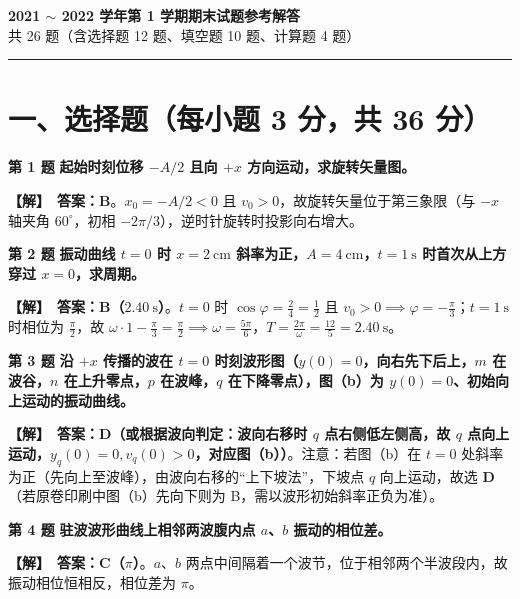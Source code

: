 \documentclass[zihao=5,a4paper,UTF8]{ctexart}
\newenvironment{prob}[2]{%
    \par\vspace{5pt}\noindent\textbf{\color{navy}#1} \textbf{#2}\par\nopagebreak\vspace{2pt}%
}{%
    \par\vspace{3pt}%
}
\newcommand{\sol}{\noindent\textbf{\color{tealaccent}【解】}\ }
\begin{document}
\begin{center}
    {\Large\bfseries\color{navy} 2021 $\sim$ 2022 学年第 1 学期期末试题参考解答}\\[4pt]
    {\small\color{gray} 共 26 题（含选择题 12 题、填空题 10 题、计算题 4 题）}
\end{center}
\vspace{2pt}\hrule\vspace{6pt}


\section*{一、选择题（每小题 3 分，共 36 分）}

\begin{prob}{第 1 题}{起始时刻位移 $-A/2$ 且向 $+x$ 方向运动，求旋转矢量图。}
\sol \textbf{答案：B}。$x_0 = -A/2 < 0$ 且 $v_0 > 0$，故旋转矢量位于第三象限（与 $-x$ 轴夹角 $60^\circ$，初相 $-2\pi/3$），逆时针旋转时投影向右增大。
\end{prob}

\begin{prob}{第 2 题}{振动曲线 $t=0$ 时 $x=2\ \mathrm{cm}$ 斜率为正，$A=4\ \mathrm{cm}$，$t=1\ \mathrm{s}$ 时首次从上方穿过 $x=0$，求周期。}
\sol \textbf{答案：B（$2.40\ \mathrm{s}$）}。$t=0$ 时 $\cos\varphi = \frac{2}{4} = \frac{1}{2}$ 且 $v_0 > 0 \implies \varphi = -\frac{\pi}{3}$；$t=1\ \mathrm{s}$ 时相位为 $\frac{\pi}{2}$，故 $\omega\cdot 1 - \frac{\pi}{3} = \frac{\pi}{2} \implies \omega = \frac{5\pi}{6}$，$T = \frac{2\pi}{\omega} = \frac{12}{5} = 2.40\ \mathrm{s}$。
\end{prob}

\begin{prob}{第 3 题}{沿 $+x$ 传播的波在 $t=0$ 时刻波形图（$y(0)=0$，向右先下后上，$m$ 在波谷，$n$ 在上升零点，$p$ 在波峰，$q$ 在下降零点），图（b）为 $y(0)=0$、初始向上运动的振动曲线。}
\sol \textbf{答案：D（或根据波向判定：波向右移时 $q$ 点右侧低左侧高，故 $q$ 点向上运动，$y_q(0)=0, v_q(0)>0$，对应图（b））}。注意：若图（b）在 $t=0$ 处斜率为正（先向上至波峰），由波向右移的“上下坡法”，下坡点 $q$ 向上运动，故选 \textbf{D}（若原卷印刷中图（b）先向下则为 B，需以波形初始斜率正负为准）。
\end{prob}

\begin{prob}{第 4 题}{驻波波形曲线上相邻两波腹内点 $a$、$b$ 振动的相位差。}
\sol \textbf{答案：C（$\pi$）}。$a$、$b$ 两点中间隔着一个波节，位于相邻两个半波段内，故振动相位恒相反，相位差为 $\pi$。
\end{prob}
\end{document}
